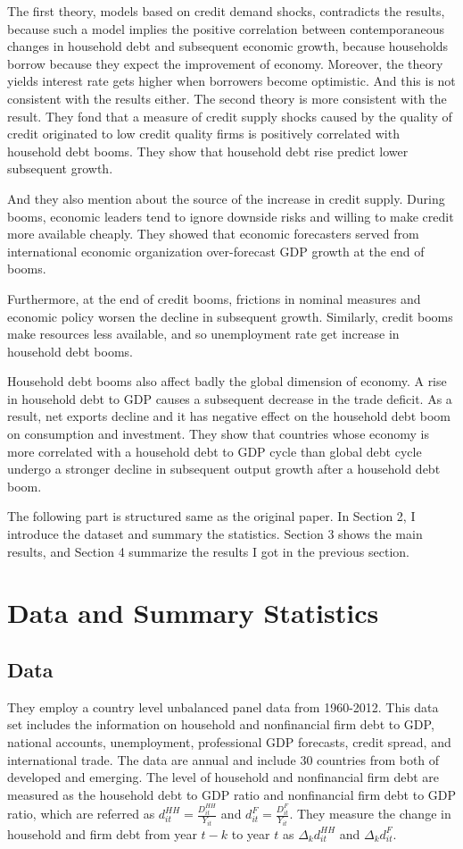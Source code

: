 \documentclass{ltjarticle}
\begin{document}
The first theory, models based on credit demand shocks, contradicts the results, because such a model implies the positive correlation between contemporaneous changes in household debt and subsequent economic growth, because households borrow because they expect the improvement of economy. Moreover, the theory yields interest rate gets higher when borrowers become optimistic. And this is not consistent with the results either.
The second theory is more consistent with the result. They fond that a measure of credit supply shocks caused by the quality of credit originated to low credit quality firms is positively correlated with household debt booms. They show that household debt rise predict lower subsequent growth.

And they also mention about the source of the increase in credit supply. During booms, economic leaders tend to ignore downside risks and willing to make credit more available cheaply. They showed that economic forecasters served from international economic organization over-forecast GDP growth at the end of booms. 

Furthermore, at the end of credit booms, frictions in nominal measures and economic policy worsen the decline in subsequent growth. Similarly, credit booms make resources less available, and so unemployment rate get increase in household debt booms.

Household debt booms also affect badly the global dimension of economy. A rise in household debt to GDP causes a subsequent decrease in the trade deficit. As a result, net exports decline and it has negative effect on the household debt boom on consumption and investment. They show that countries whose economy is more correlated with a household debt to GDP cycle than global debt cycle undergo a stronger decline in subsequent output growth after a household debt boom.

The following part is structured same as the original paper. In Section 2, I introduce the dataset and summary the statistics. Section 3 shows the main results, and Section 4 summarize the results I got in the previous section.

\section{Data and Summary Statistics}
\subsection{Data}
They employ a country level unbalanced panel data from 1960-2012. This data set includes the information on household and nonfinancial firm debt to GDP, national accounts, unemployment, professional GDP forecasts, credit spread, and international trade. The data are annual and include 30 countries from both of developed and emerging. The level of household and nonfinancial firm debt are measured as the household debt to GDP ratio and nonfinancial firm debt to GDP ratio, which are referred as $d_{it}^{HH}=\frac{D_{it}^{HH}}{Y_{it}}$ and $d_{it}^{F}=\frac{D_{it}^{F}}{Y_{it}}$. They measure the change in household and firm debt from year $t-k$ to year $t$ as $\Delta_{k} d_{it}^{HH} $ and $\Delta_{k}d_{it}^{F} $.
\end{document}
